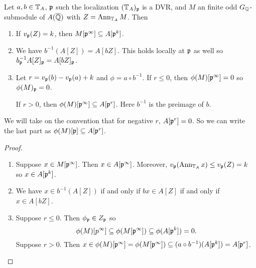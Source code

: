 \begin{lemma}\label{lem:com_alg}
    Let $a,b\in \mathbb{T}_A$, $\mathfrak{p}$ such the localization $(\mathbb{T}_A)_{\mathfrak{p}}$ is a DVR, and
    $M$ an finite odd $G_{\mathbb{Q}}$-submodule of $A(\overline{\mathbb{Q}})$ with $Z=\operatorname{Ann}_{\mathbb{T}_A} M$.
    Then
    \begin{enumerate}
        \item
            If $v_{\mathfrak{p}}(Z) = k$, then $M[\mathfrak{p}^\infty]\subseteq A[\mathfrak{p}^k]$.
        \item
            We have $b^{-1}(A[Z])=A[bZ]$. This holds locally at $\mathfrak{p}$ as well so
            $b_{\mathfrak{p}} ^{-1} A[Z]_{\mathfrak{p}} = A[bZ]_{\mathfrak{p}}$.
        \item
            Let $r=v_{\mathfrak{p}}(b)-v_{\mathfrak{p}}(a)+k$ and $\phi=a\circ b^{-1}$. If $r\leq
            0$, then $\phi(M)[\mathfrak{p}^\infty]=0$ so $\phi(M)_{\mathfrak{p}}=0$.

            If $r>0$, then
            $\phi(M)[\mathfrak{p}^\infty]\subseteq A[\mathfrak{p}^r]$. Here $b^{-1}$ is the
            preimage of $b$.
    \end{enumerate}
    We will take on the convention that for negative $r$, $A[\mathfrak{p}^r]=0$. So we can
    write the last part as $\phi(M)[\mathfrak{p}]\subseteq A[\mathfrak{p}^r]$.
\end{lemma}
\begin{proof}
    \mbox{}
    \begin{enumerate}
        \item
            Suppose $x\in M[\mathfrak{p}^\infty]$. Then $x\in A[\mathfrak{p}^\infty]$. Moreover,
            $v_{\mathfrak{p}}(\operatorname{Ann}_{\mathbb{T}_A} x) \leq v_{\mathfrak{p}}(Z) = k$ so $x\in A[\mathfrak{p}^k]$.
        \item
            We have $x\in b^{-1}(A[Z])$ if and only if $bx \in A[Z]$ if and
            only if $x\in A[bZ]$.
        \item
            Suppose $r\leq 0$. Then $\phi_{\mathfrak{p}} \in Z_{\mathfrak{p}}$ so
            \[
                \phi(M)[p^\infty]\subseteq \phi(M[\mathfrak{p}^\infty])
                \subseteq \phi(A[\mathfrak{p}^k]) = 0.
            \]
            Suppose $r>0$. Then $x\in \phi(M)[\mathfrak{p}^\infty] =
            \phi(M[\mathfrak{p}^\infty])\subseteq (a\circ
            b^{-1})(A[\mathfrak{p}^k])=A[\mathfrak{p}^r]$.
    \end{enumerate}
\end{proof}


